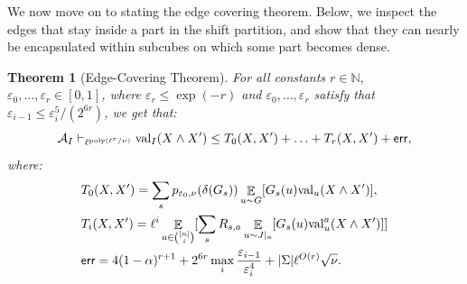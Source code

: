 \documentclass[11pt]{article}
\DeclareMathOperator*{\E}{\mathbb{E}}
\def \N {\mathbb{N}}
\def \cA {\mathcal{A}}
\def \poly {\mathrm{poly}}
\def \eps {{\varepsilon}}
\def \val {\mathrm{val}}
\newtheorem{theorem}{Theorem}[section]
\theoremstyle{definition}
\begin{document}
We now move on to stating the edge covering theorem. 
Below, we inspect the edges that stay inside a part in the shift partition, and show that they can nearly be encapsulated within subcubes on which some part becomes dense.
\begin{theorem}[Edge-Covering Theorem]\label{thm:edge-covering-restated}
For all constants $r \in \N$, $\eps_0, \ldots, \eps_r \in [0,1]$, where $\eps_r \leq \exp(-r)$ and $\eps_0, \ldots, \eps_r$ satisfy that $\eps_{i-1} \leq \eps_i^5/(2^{6r})$, we get that:
\begin{equation}\label{eq:edge-cov-final}
\cA_I \vdash_{\ell^{\poly(\ell^r/\nu)}}  \val_I(X \wedge X') \leq T_0(X,X') + \ldots + T_r(X,X') + \sf{err},
\end{equation}
where:
\begin{align*}
&T_0(X,X') = \sum_s p_{\eps_0,\nu}(\delta(G_s))\E_{u \sim G}[ G_s(u)\val_u(X \wedge X')],\\
&T_i(X,X') = \ell^{i}\E_{a \in {[n] \choose i}}[\sum_s R_{s,a}
\E_{u \sim J|_a}[G_s(u)\val^a_u(X \wedge X')]] \\
&{\sf err} = 4(1-\alpha)^{r+1} + 2^{6r}\max_{i}\frac{\eps_{i-1}}{\eps_i^4}+ |\Sigma|\ell^{O(r)}\sqrt{\nu}.
\end{align*}
\end{theorem}
\end{document}
